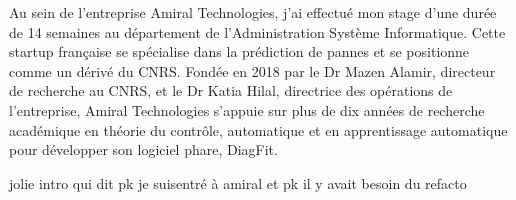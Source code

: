 Au sein de l'entreprise Amiral Technologies, j'ai effectué mon stage d'une durée de 14 semaines au département de l'Administration Système Informatique.
Cette startup française se spécialise dans la prédiction de pannes et se positionne comme un dérivé du CNRS.
Fondée en 2018 par le Dr Mazen Alamir, directeur de recherche au CNRS, et le Dr Katia Hilal, directrice des opérations de l'entreprise, Amiral Technologies s'appuie sur plus de dix années de recherche académique en théorie du contrôle, automatique et en apprentissage automatique pour développer son logiciel phare, DiagFit.

jolie intro qui dit pk je suisentré à amiral et pk il y avait besoin du refacto
